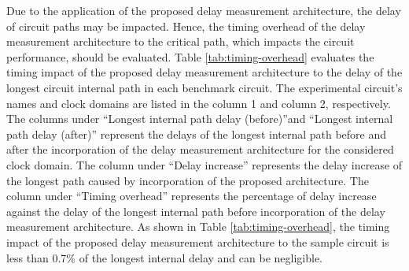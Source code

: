 Due to the application of the proposed delay measurement architecture, the delay of circuit paths may be impacted. Hence, the timing overhead of the delay measurement architecture to the critical path, which impacts the circuit performance, should be evaluated. Table \ref{tab:timing-overhead} evaluates the timing impact of the proposed delay measurement architecture to the delay of the longest circuit internal path in each benchmark circuit. The experimental circuit’s names and clock domains are listed in the column 1 and column 2, respectively. The columns under “Longest internal path delay (before)”and “Longest internal path delay (after)” represent the delays of the longest internal path before and after the incorporation of the delay measurement architecture for the considered clock domain. The column under “Delay increase” represents the delay increase of the longest path caused by incorporation of the proposed architecture. The column under “Timing overhead” represents the percentage of delay increase against the delay of the longest internal path before incorporation of the delay measurement architecture. As shown in Table \ref{tab:timing-overhead}, the timing impact of the proposed delay measurement architecture to the sample circuit is less than 0.7\% of the longest internal delay and can be negligible.

